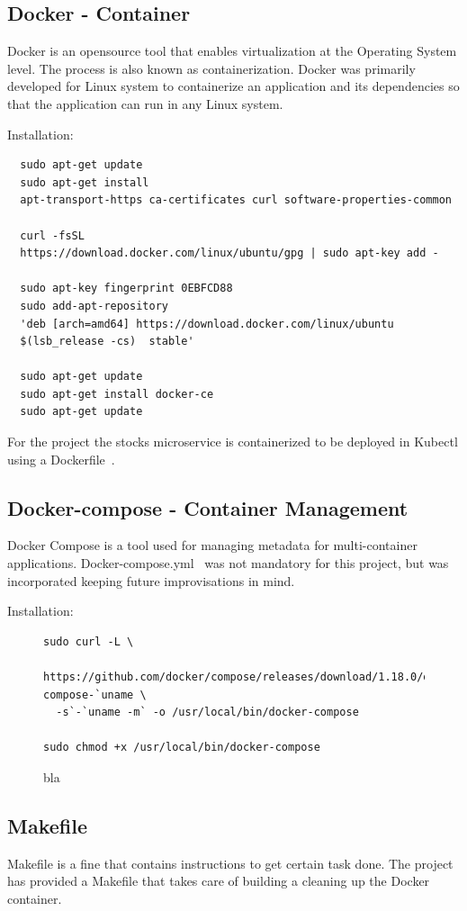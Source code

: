 \subsection{Docker - Container}
Docker is an opensource tool that enables virtualization at the Operating
System level. The process is also known as containerization. Docker was
primarily developed for Linux system to containerize an application and its
dependencies so that the application can run in any Linux system.

Installation:
\begin{verbatim}
  sudo apt-get update
  sudo apt-get install 
  apt-transport-https ca-certificates curl software-properties-common

  curl -fsSL 
  https://download.docker.com/linux/ubuntu/gpg | sudo apt-key add -

  sudo apt-key fingerprint 0EBFCD88
  sudo add-apt-repository 
  'deb [arch=amd64] https://download.docker.com/linux/ubuntu 
  $(lsb_release -cs)  stable'

  sudo apt-get update
  sudo apt-get install docker-ce
  sudo apt-get update
\end{verbatim}
For the project the stocks microservice is containerized to be deployed in
Kubectl using a Dockerfile~\cite{hid-sp18-417-Dockerfile}.

\subsection{Docker-compose - Container Management}
Docker Compose is a tool used for managing metadata for multi-container
applications. Docker-compose.yml~\cite{hid-sp18-417-docker-compose} was not
mandatory for this project, but was incorporated keeping future improvisations
in mind. 

Installation:

\begin{figure}[htb]
\begin{verbatim}
sudo curl -L \
  https://github.com/docker/compose/releases/download/1.18.0/docker-compose-`uname \
  -s`-`uname -m` -o /usr/local/bin/docker-compose

sudo chmod +x /usr/local/bin/docker-compose
\end{verbatim}
\caption{bla}
\end{figure}

\subsection{Makefile}
Makefile is a fine that contains instructions to get certain task done. The
project has provided a Makefile that takes care of building a cleaning up the
Docker container.

